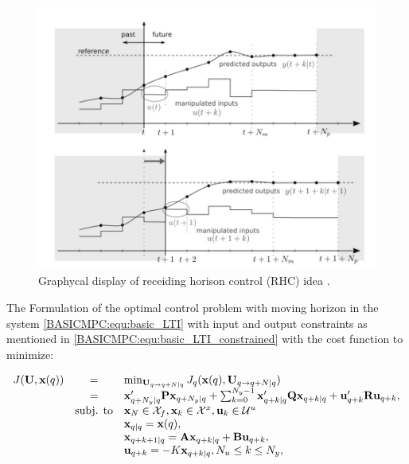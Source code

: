 \begin{figure}[!ht]
        \centering
        \includegraphics[width=.9\textwidth]{EMPC_PNG_Pics/RHC_gray.jpg}
        \caption{Graphycal display of receiding horison control (RHC) idea \cite{borrelli2017predictive}.}
        \label{BASICCSR:fig:RHC}
    \end{figure}

The Formulation of the optimal control problem with moving horizon \cite{goodwin2006constrained} in the system \ref{BASICMPC:equ:basic_LTI} with input and output constraints as mentioned in \ref{BASICMPC:equ:basic_LTI_constrained} with the cost function to minimize:
		
		\begin{equation}
        \begin{array}{rcl}
				J(\textbf{U},\textbf{x}(q))&=&\min_{\textbf{U}_{q\rightarrow q+N|q}}J_q(\textbf{x}(q),\textbf{U}_{q\rightarrow q+N|q})\\
                &=&\textbf{x}'_{q+N_y|q}\textbf{P}\textbf{x}_{q+N_y|q}+\sum^{N_y-1}_{k=0}\textbf{x}'_{q+k|q}\textbf{Q}\textbf{x}_{q+k|q}+\textbf{u}'_{q+k}\textbf{R}\textbf{u}_{q+k},\\
				&\textnormal{subj. to}&\textbf{x}_N\in\mathcal{X}_f,\textbf{x}_k\in\mathcal{X}^x,\textbf{u}_k\in\mathcal{U}^u\\
				&&\textbf{x}_{q|q}=\textbf{x}(q),\\
				&&\textbf{x}_{q+k+1|q}=\textbf{A}\textbf{x}_{q+k|q}+\textbf{B}\textbf{u}_{q+k},\\
				&&\textbf{u}_{q+k}=-K\textbf{x}_{q+k|q}, N_u\leq k\leq N_y,\\
        \end{array}
        \label{BASICMPC:equ:receiding_horison_problem}
    \end{equation}
		
